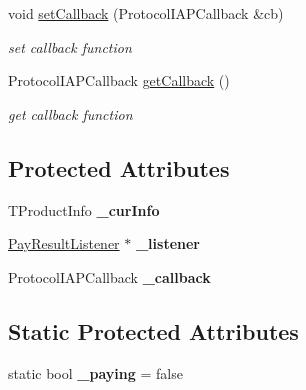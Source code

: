 \begin{DoxyCompactItemize}
\mbox{\label{classcocos2d_1_1plugin_1_1ProtocolIAP_a312f740988cf288081b4c9c934fb5fc3}} 
void \hyperlink{classcocos2d_1_1plugin_1_1ProtocolIAP_a312f740988cf288081b4c9c934fb5fc3}{set\+Callback} (Protocol\+I\+A\+P\+Callback \&cb)
\begin{DoxyCompactList}\small\item\em set callback function \end{DoxyCompactList}\item 
\mbox{\label{classcocos2d_1_1plugin_1_1ProtocolIAP_a368b0b817bca36ddfbceaab4f5af149e}} 
Protocol\+I\+A\+P\+Callback \hyperlink{classcocos2d_1_1plugin_1_1ProtocolIAP_a368b0b817bca36ddfbceaab4f5af149e}{get\+Callback} ()
\begin{DoxyCompactList}\small\item\em get callback function \end{DoxyCompactList}\end{DoxyCompactItemize}
\subsection*{Protected Attributes}
\begin{DoxyCompactItemize}
\item 
\mbox{\label{classcocos2d_1_1plugin_1_1ProtocolIAP_a171ea817eba6eca8fb06c40b97e06f04}} 
T\+Product\+Info {\bfseries \+\_\+cur\+Info}
\item 
\mbox{\label{classcocos2d_1_1plugin_1_1ProtocolIAP_a233eff9a8ee38016363a727a13e16558}} 
\hyperlink{classcocos2d_1_1plugin_1_1PayResultListener}{Pay\+Result\+Listener} $\ast$ {\bfseries \+\_\+listener}
\item 
\mbox{\label{classcocos2d_1_1plugin_1_1ProtocolIAP_a0eef13b41a8764d3a585ba23fd4ad662}} 
Protocol\+I\+A\+P\+Callback {\bfseries \+\_\+callback}
\end{DoxyCompactItemize}
\subsection*{Static Protected Attributes}
\begin{DoxyCompactItemize}
\item 
\mbox{\label{classcocos2d_1_1plugin_1_1ProtocolIAP_a3cab9dcc8de69e97b2eb0ed60f180aac}} 
static bool {\bfseries \+\_\+paying} = false
\end{DoxyCompactItemize}



